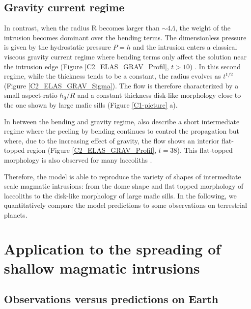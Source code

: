 \subsection{Gravity current regime}
\label{C2-sec:grav-curr-regime}

In contrast,  when the radius  R becomes larger than  $\sim 4\Lambda$,
the weight of  the intrusion becomes dominant over  the bending terms.
The  dimensionless  pressure  is  given by  the  hydrostatic  pressure
$P = h$  and the intrusion enters a classical  viscous gravity current
regime where bending terms only affect the solution near the intrusion
edge         (Figure        \ref{C2_ELAS_GRAV_Profil},         $t>10$)
\citep{Huppert:1982a,Michaut:2011kg,Lister:2013ia}.   In  this  second
regime, while the thickness tends to be a constant, the radius evolves
as $t^{1/2}$ (Figure \ref{C2_ELAS_GRAV_Sigma}).  The flow is therefore
characterized by a small aspect-ratio $h_0/R$ and a constant thickness
disk-like  morphology close  to the  one  shown by  large mafic  sills
(Figure \ref{C1-picture} a).

In between the bending  and gravity regime, \citet{Lister:2013ia} also
describe  a short  intermediate regime  where the  peeling by  bending
continues to control the propagation  but where, due to the increasing
effect  of gravity,  the  flow shows  an  interior flat-topped  region
(Figure   \ref{C2_ELAS_GRAV_Profil},    $t=38$).    This   flat-topped
morphology     is     also     observed    for     many     laccoliths
\citep{Koch:1981if,Bunger:2011cb}.

Therefore, the  model is able  to reproduce  the variety of  shapes of
intermediate scale magmatic  intrusions: from the dome  shape and flat
topped morphology  of laccoliths to  the disk-like morphology  of large
mafic sills.   In the following,  we quantitatively compare  the model
predictions to some observations on terrestrial planets.


\section[Application to the spreading of shallow intrusions]{Application to the spreading of shallow magmatic intrusions}
\label{C2-sec:appl-earth-moon}

\subsection{Observations versus predictions on Earth}
\label{C2-sec:observ-vs-pred-Earth}

